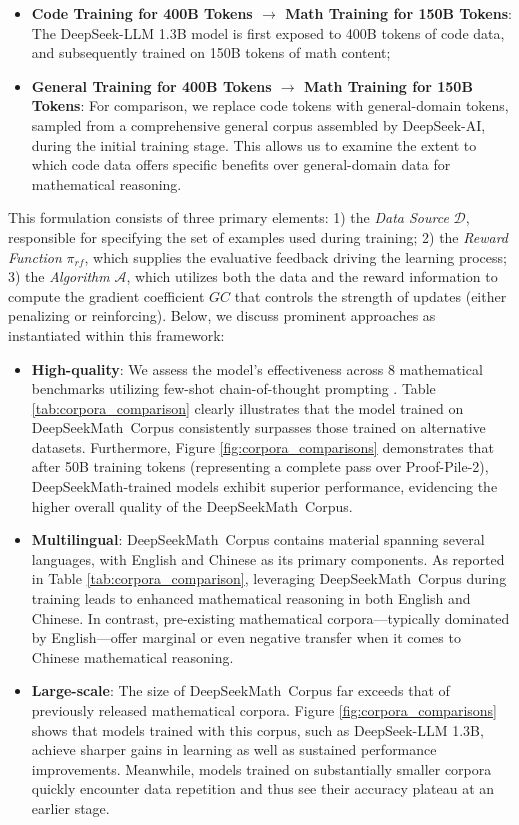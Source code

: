 \begin{itemize}[topsep=0pt]
\begin{itemize}[topsep=0pt]
    \item \textbf{Code Training for 400B Tokens $\rightarrow$ Math Training for 150B Tokens}: The DeepSeek-LLM 1.3B model is first exposed to 400B tokens of code data, and subsequently trained on 150B tokens of math content;
    \item \textbf{General Training for 400B Tokens $\rightarrow$ Math Training for 150B Tokens}: For comparison, we replace code tokens with general-domain tokens, sampled from a comprehensive general corpus assembled by DeepSeek-AI, during the initial training stage. This allows us to examine the extent to which code data offers specific benefits over general-domain data for mathematical reasoning.
\end{itemize}

This formulation consists of three primary elements: 1) the \textit{Data Source} $\mathcal{D}$, responsible for specifying the set of examples used during training; 2) the \textit{Reward Function} $\pi_{{rf}}$, which supplies the evaluative feedback driving the learning process; 3) the \textit{Algorithm} $\mathcal{A}$, which utilizes both the data and the reward information to compute the gradient coefficient $GC$ that controls the strength of updates (either penalizing or reinforcing). Below, we discuss prominent approaches as instantiated within this framework:

\begin{itemize}[topsep=0pt]
    \item \textbf{High-quality}:
    We assess the model’s effectiveness across 8 mathematical benchmarks utilizing few-shot chain-of-thought prompting \cite{cot}. Table \ref{tab:corpora_comparison} clearly illustrates that the model trained on DeepSeekMath~Corpus consistently surpasses those trained on alternative datasets. Furthermore, Figure \ref{fig:corpora_comparisons} demonstrates that after 50B training tokens (representing a complete pass over Proof-Pile-2), DeepSeekMath-trained models exhibit superior performance, evidencing the higher overall quality of the DeepSeekMath~Corpus.
    \item \textbf{Multilingual}:
    DeepSeekMath~Corpus contains material spanning several languages, with English and Chinese as its primary components. As reported in Table \ref{tab:corpora_comparison}, leveraging DeepSeekMath~Corpus during training leads to enhanced mathematical reasoning in both English and Chinese. In contrast, pre-existing mathematical corpora—typically dominated by English—offer marginal or even negative transfer when it comes to Chinese mathematical reasoning.
    \item \textbf{Large-scale}:
    The size of DeepSeekMath~Corpus far exceeds that of previously released mathematical corpora. Figure \ref{fig:corpora_comparisons} shows that models trained with this corpus, such as DeepSeek-LLM 1.3B, achieve sharper gains in learning as well as sustained performance improvements. Meanwhile, models trained on substantially smaller corpora quickly encounter data repetition and thus see their accuracy plateau at an earlier stage.
\end{itemize}


\end{itemize}
